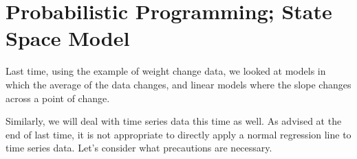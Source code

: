 \documentclass{ltjsbook}
\begin{document}
\chapter{Probabilistic Programming; State Space Model}
\label{x29_SSpace}
Last time, using the example of weight change data, we looked at models in which the average of the data changes, and linear models where the slope changes across a point of change.

Similarly, we will deal with time series data this time as well. As advised at the end of last time, it is not appropriate to directly apply a normal regression line to time series data. Let's consider what precautions are necessary.

\end{document}
